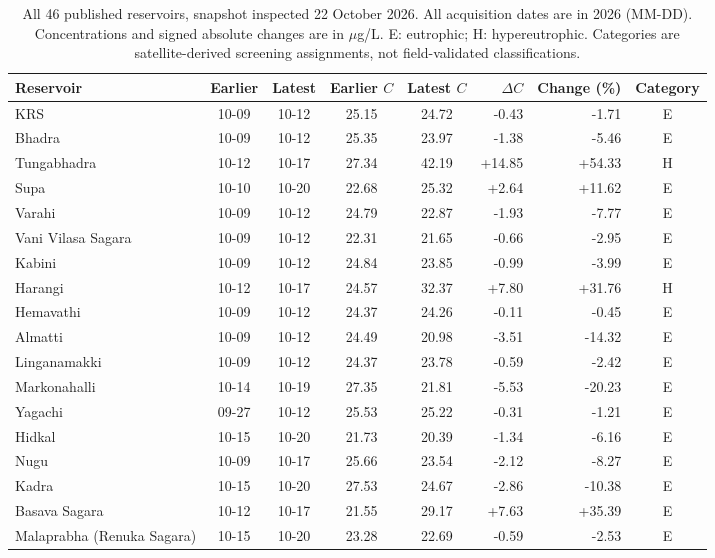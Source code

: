 \documentclass[conference]{IEEEtran}
\begin{document}


\begin{table}[t]
\centering
\caption{All 46 published reservoirs, snapshot inspected 22 October 2026. All acquisition dates are in 2026 (MM-DD). Concentrations and signed absolute changes are in $\mu$g/L. E: eutrophic; H: hypereutrophic. Categories are satellite-derived screening assignments, not field-validated classifications.}\label{tab:all}
\small\setlength{\tabcolsep}{7pt}\renewcommand{\arraystretch}{1.06}
\begin{tabular}{@{}lccccrrc@{}}\toprule
Reservoir & Earlier & Latest & Earlier $C$ & Latest $C$ & $\Delta C$ & Change (\%) & Category\\\midrule
KRS & 10-09 & 10-12 & 25.15 & 24.72 & -0.43 & -1.71 & E \\
Bhadra & 10-09 & 10-12 & 25.35 & 23.97 & -1.38 & -5.46 & E \\
Tungabhadra & 10-12 & 10-17 & 27.34 & 42.19 & +14.85 & +54.33 & H \\
Supa & 10-10 & 10-20 & 22.68 & 25.32 & +2.64 & +11.62 & E \\
Varahi & 10-09 & 10-12 & 24.79 & 22.87 & -1.93 & -7.77 & E \\
Vani Vilasa Sagara & 10-09 & 10-12 & 22.31 & 21.65 & -0.66 & -2.95 & E \\
Kabini & 10-09 & 10-12 & 24.84 & 23.85 & -0.99 & -3.99 & E \\
Harangi & 10-12 & 10-17 & 24.57 & 32.37 & +7.80 & +31.76 & H \\
Hemavathi & 10-09 & 10-12 & 24.37 & 24.26 & -0.11 & -0.45 & E \\
Almatti & 10-09 & 10-12 & 24.49 & 20.98 & -3.51 & -14.32 & E \\
Linganamakki & 10-09 & 10-12 & 24.37 & 23.78 & -0.59 & -2.42 & E \\
Markonahalli & 10-14 & 10-19 & 27.35 & 21.81 & -5.53 & -20.23 & E \\
Yagachi & 09-27 & 10-12 & 25.53 & 25.22 & -0.31 & -1.21 & E \\
Hidkal & 10-15 & 10-20 & 21.73 & 20.39 & -1.34 & -6.16 & E \\
Nugu & 10-09 & 10-17 & 25.66 & 23.54 & -2.12 & -8.27 & E \\
Kadra & 10-15 & 10-20 & 27.53 & 24.67 & -2.86 & -10.38 & E \\
Basava Sagara & 10-12 & 10-17 & 21.55 & 29.17 & +7.63 & +35.39 & E \\
Malaprabha (Renuka Sagara) & 10-15 & 10-20 & 23.28 & 22.69 & -0.59 & -2.53 & E \\

\end{tabular}
\end{table}
\end{document}
